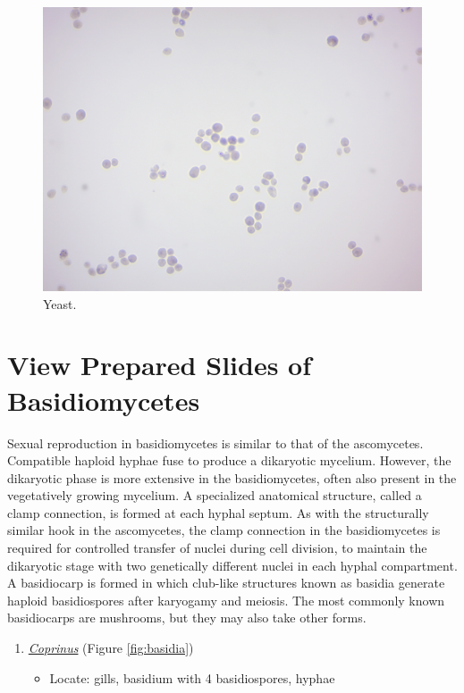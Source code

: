 \begin{figure}

{\centering \includegraphics[width=0.7\linewidth]{./figures/fungi/yeast}

}

\caption{Yeast.}\label{fig:yeast}
\end{figure}

\section{View Prepared Slides of
Basidiomycetes}\label{view-the-prepared-slides-of-basidiomycetes}

Sexual reproduction in basidiomycetes is similar to that of the
ascomycetes. Compatible haploid hyphae fuse to produce a dikaryotic
mycelium. However, the dikaryotic phase is more extensive in the
basidiomycetes, often also present in the vegetatively growing mycelium.
A specialized anatomical structure, called a clamp connection, is formed
at each hyphal septum. As with the structurally similar hook in the
ascomycetes, the clamp connection in the basidiomycetes is required for
controlled transfer of nuclei during cell division, to maintain the
dikaryotic stage with two genetically different nuclei in each hyphal
compartment. A basidiocarp is formed in which club-like structures known
as basidia generate haploid basidiospores after karyogamy and meiosis.
The most commonly known basidiocarps are mushrooms, but they may also
take other forms.

\begin{enumerate}
\def\labelenumi{\arabic{enumi}.}
\tightlist
\item
  \href{https://en.wikipedia.org/wiki/Coprinus}{\emph{Coprinus}} (Figure
  \ref{fig:basidia})

  \begin{itemize}
  \tightlist
  \item
    Locate: gills, basidium with 4 basidiospores, hyphae
  \end{itemize}
\end{enumerate}

